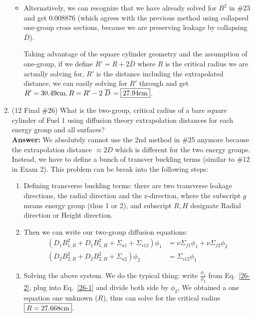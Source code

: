 \documentclass{school-22.211-notes}
\begin{document}
\begin{enumerate}
\begin{itemize}
\item Alternatively, we can recognize that we have already solved for $B^2$ in \#23 and get 0.008876 (which agrees with the previous method using collapsed one-group cross sections, because we are preserving leakage by collapsing $\bar{D}$). 

Taking advantage of the square cylinder geometry and the assumption of one-group, if we define $R' = R + 2 \bar{D}$ where $R$ is the critical radius we are actually solving for, $R'$ is the distance including the extrapolated distance, we can easily solving for $R'$ through 
  and get $R' = 30.49\mathrm{cm}, R = R' - 2\left.\overline{D} \right. = \boxed{ 27.94 \mathrm{cm}}$. 
\end{itemize}


\item (12 Final \#26) What is the two-group, critical radius of a bare square cylinder of Fuel 1 using diffusion theory extrapolation distances for each energy group and all surfaces? \\
\textbf{Answer:} We absolutely cannot use the 2nd method in \#25 anymore because the extrapolation distance $\approx 2D$ which is different for the two energy groups. Instead, we have to define a bunch of transver buckling terms (similar to \#12 in Exam 2). This problem can be break into the following steps: 
\begin{enumerate}
\item Defining transverse buckling terms: there are two transverse leakage directions, the radial direction and the z-direction, 
where the subscript $g$ means energy group (thus 1 or 2), and subscript $R, H$ designate Radial direction or Height direction. 

\item Then we can write our two-group diffusion equations: 
\begin{align}
(D_1 B_{1,R}^2 + D_1 B_{1,H}^2 + \Sigma_{a1} + \Sigma_{s12} ) \phi_1 &= \nu \Sigma_{f1} \phi_1 + \nu \Sigma_{f2} \phi_2  \label{26-1}\\
(D_2 B_{2,R}^2 + D_2 B_{2,H}^2 + \Sigma_{a2} ) \phi_2 &= \Sigma_{s12} \phi_1  \label{26-2}
\end{align}

\item Solving the above system. We do the typical thing: write $\frac{\phi_1}{\phi_2}$ from Eq.~\ref{26-2}, 
plug into Eq.~\ref{26-1} and divide both side by $\phi_2$, 
We obtained a one equation one unknown ($R$), thus can solve for the critical radius $\boxed{ R = 27.668 \mathrm{cm}}$. 
\end{enumerate}


\end{enumerate}
\end{document}
